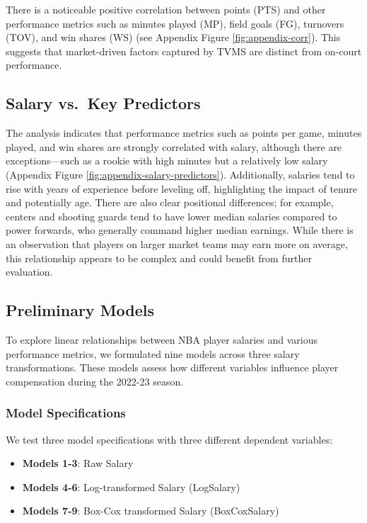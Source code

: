 \documentclass[
  11pt,
]{article}
\begin{document}
There is a noticeable positive correlation between points (PTS) and other performance metrics such as minutes played (MP), field goals (FG), turnovers (TOV), and win shares (WS) (see Appendix Figure \ref{fig:appendix-corr}). This suggests that market-driven factors captured by TVMS are distinct from on-court performance.

\hypertarget{salary-vs.-key-predictors}{%
\subsection{Salary vs.~Key Predictors}\label{salary-vs.-key-predictors}}

The analysis indicates that performance metrics such as points per game, minutes played, and win shares are strongly correlated with salary, although there are exceptions---such as a rookie with high minutes but a relatively low salary (Appendix Figure \ref{fig:appendix-salary-predictors}). Additionally, salaries tend to rise with years of experience before leveling off, highlighting the impact of tenure and potentially age. There are also clear positional differences; for example, centers and shooting guards tend to have lower median salaries compared to power forwards, who generally command higher median earnings. While there is an observation that players on larger market teams may earn more on average, this relationship appears to be complex and could benefit from further evaluation.

\hypertarget{preliminary-models}{%
\subsection{Preliminary Models}\label{preliminary-models}}

To explore linear relationships between NBA player salaries and various performance metrics, we formulated nine models across three salary transformations. These models assess how different variables influence player compensation during the 2022-23 season.

\hypertarget{model-specifications}{%
\subsubsection{Model Specifications}\label{model-specifications}}

We test three model specifications with three different dependent variables:

\begin{itemize}
\item
  \textbf{Models 1-3}: Raw Salary
\item
  \textbf{Models 4-6}: Log-transformed Salary (LogSalary)
\item
  \textbf{Models 7-9}: Box-Cox transformed Salary (BoxCoxSalary)
\end{itemize}
\end{document}
